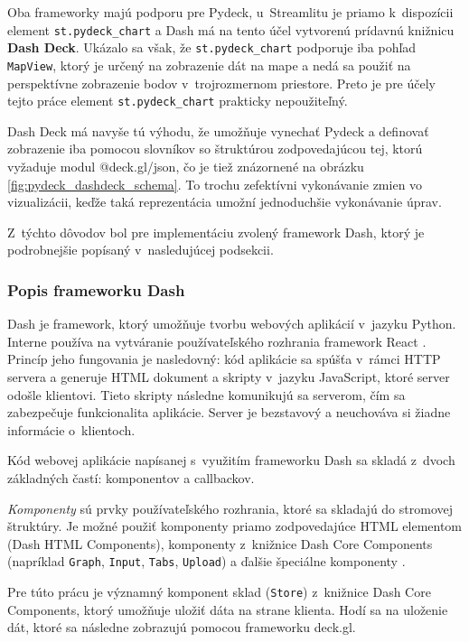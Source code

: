 Oba frameworky majú podporu pre Pydeck, u~Streamlitu je priamo k~dispozícii element \texttt{st.pydeck\_chart} a Dash má na tento účel vytvorenú prídavnú knižnicu \textbf{Dash Deck}. Ukázalo sa však, že \texttt{st.pydeck\_chart} podporuje iba pohľad \texttt{MapView}, ktorý je určený na zobrazenie dát na mape a nedá sa použiť na perspektívne zobrazenie bodov v~trojrozmernom priestore. Preto je pre účely tejto práce element \texttt{st.pydeck\_chart} prakticky nepoužiteľný.

Dash Deck má navyše tú výhodu, že umožňuje vynechať Pydeck a definovať zobrazenie iba pomocou slovníkov so štruktúrou zodpovedajúcou tej, ktorú vyžaduje modul @deck.gl/json, čo je tiež znázornené na obrázku \ref{fig:pydeck_dashdeck_schema}. To trochu zefektívni vykonávanie zmien vo vizualizácii, keďže taká reprezentácia umožní jednoduchšie vykonávanie úprav.

Z~týchto dôvodov bol pre implementáciu zvolený framework Dash, ktorý je podrobnejšie popísaný v~nasledujúcej podsekcii.

\subsubsection{Popis frameworku Dash}

Dash je framework, ktorý umožňuje tvorbu webových aplikácií v~jazyku Python. Interne používa na vytváranie používateľského rozhrania framework React \cite{dash_documentation}. Princíp jeho fungovania je nasledovný: kód aplikácie sa spúšťa v~rámci HTTP servera a generuje HTML dokument a skripty v~jazyku JavaScript, ktoré server odošle klientovi. Tieto skripty následne komunikujú sa serverom, čím sa zabezpečuje funkcionalita aplikácie. Server je bezstavový a neuchováva si žiadne informácie o~klientoch.

Kód webovej aplikácie napísanej s~využitím frameworku Dash sa skladá z~dvoch základných častí: komponentov a callbackov.

\emph{Komponenty} sú prvky používateľského rozhrania, ktoré sa skladajú do stromovej štruktúry. Je možné použiť komponenty priamo zodpovedajúce HTML elementom (Dash HTML Components), komponenty z~knižnice Dash Core Components (napríklad \texttt{Graph}, \texttt{Input}, \texttt{Tabs}, \texttt{Upload}) a ďalšie špeciálne komponenty \cite{dash_documentation}.

Pre túto prácu je významný komponent sklad (\texttt{Store}) z~knižnice Dash Core Components, ktorý umožňuje uložiť dáta na strane klienta. Hodí sa na uloženie dát, ktoré sa následne zobrazujú pomocou frameworku deck.gl.

